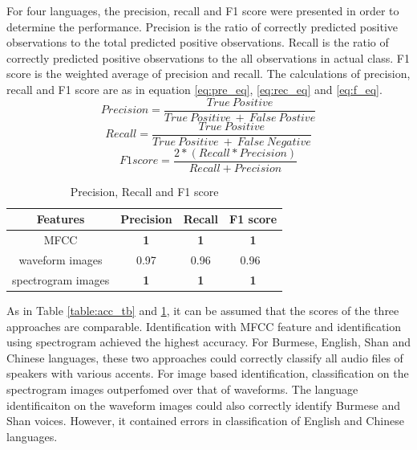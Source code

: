 \documentclass[conference]{IEEEtran}
\begin{document}
For four languages, the precision, recall and F1 score were presented in order to determine the performance. Precision is the ratio of correctly predicted positive observations to the total predicted positive observations. Recall is the ratio of correctly predicted positive observations to the all observations in actual class. F1 score is the weighted average of precision and recall. The calculations of precision, recall and F1 score are as in equation \ref{eq:pre_eq}, \ref{eq:rec_eq} and \ref{eq:f_eq}.
\begin{equation}
Precision = \frac{True\: Positive}{True\: Positive\: +\: False\: Postive}\label{eq:pre_eq}
\end{equation}
\begin{equation}
Recall = \frac{True\: Positive}{True\: Positive\: +\: False\: Negative}\label{eq:rec_eq}
\end{equation}
\begin{equation}
F1 score = \frac{2*(Recall*Precision)}{Recall+ Precision}\label{eq:f_eq}
\end{equation}
\begin{table}[htbp]
\caption{Precision, Recall and F1 score}
\begin{center}
\begin{tabular}{|c|c|c|c|}
\hline
\textbf{Features}&\textbf{Precision} &\textbf{Recall} &\textbf{F1 score} \\
\hline
MFCC &\textbf{1} &\textbf{1} &\textbf{1} \\
\hline
waveform images &0.97 &0.96 &0.96\ \\
\hline
spectrogram images &\textbf{1} &\textbf{1} &\textbf{1}  \\
\hline
\end{tabular}
\label{table:prf_tb}
\end{center}
\end{table}

As in Table \ref{table:acc_tb} and \ref{table:prf_tb}, it can be assumed that the scores of the three approaches are comparable. Identification with MFCC feature and identification using spectrogram achieved the highest accuracy. For Burmese, English, Shan and Chinese languages, these two approaches could correctly classify all audio files of speakers with various accents. For image based identification, classification on the spectrogram images outperfomed over that of waveforms. The language identificaiton on the waveform images could also correctly identify Burmese and Shan voices. However, it contained errors in classification of English and Chinese languages.
\end{document}
